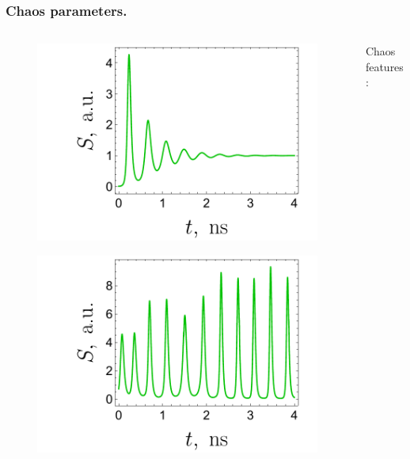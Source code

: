 \begin{frame}
	\frametitle{Chaos parameters.}
	
	\begin{columns}
		\begin{column}{.4\linewidth}
			\begin{figure}
				\centering
				\includegraphics[width=\linewidth]{figures/laser_classic.pdf}
			\end{figure}
			\begin{figure}
				\centering
				\includegraphics[width=\linewidth]{figures/laser_chaos.pdf}
			\end{figure}
		\end{column}
		\begin{column}{.6\linewidth}
			Chaos features:
			\begin{itemize}
			\end{itemize}
			

\end{column}
\end{columns}
\end{frame}
